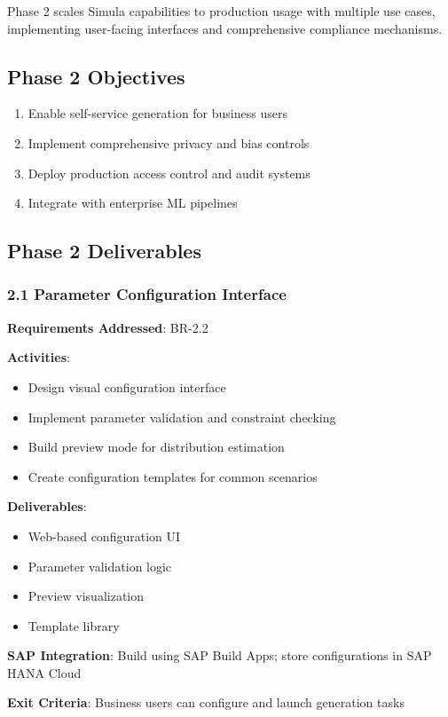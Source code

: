 Phase 2 scales Simula capabilities to production usage with multiple use cases,
implementing user-facing interfaces and comprehensive compliance mechanisms.

\subsection{Phase 2 Objectives}

\begin{enumerate}
  \item Enable self-service generation for business users
  \item Implement comprehensive privacy and bias controls
  \item Deploy production access control and audit systems
  \item Integrate with enterprise ML pipelines
\end{enumerate}

\subsection{Phase 2 Deliverables}

\subsubsection{2.1 Parameter Configuration Interface}

\begin{tcolorbox}[colback=green!5,colframe=green!70,title=2.1 User Configuration Interface]
\textbf{Requirements Addressed}: BR-2.2

\textbf{Activities}:
\begin{itemize}
  \item Design visual configuration interface
  \item Implement parameter validation and constraint checking
  \item Build preview mode for distribution estimation
  \item Create configuration templates for common scenarios
\end{itemize}

\textbf{Deliverables}:
\begin{itemize}
  \item Web-based configuration UI
  \item Parameter validation logic
  \item Preview visualization
  \item Template library
\end{itemize}

\textbf{SAP Integration}: Build using SAP Build Apps; store configurations in
SAP HANA Cloud

\textbf{Exit Criteria}: Business users can configure and launch generation tasks
\end{tcolorbox}

